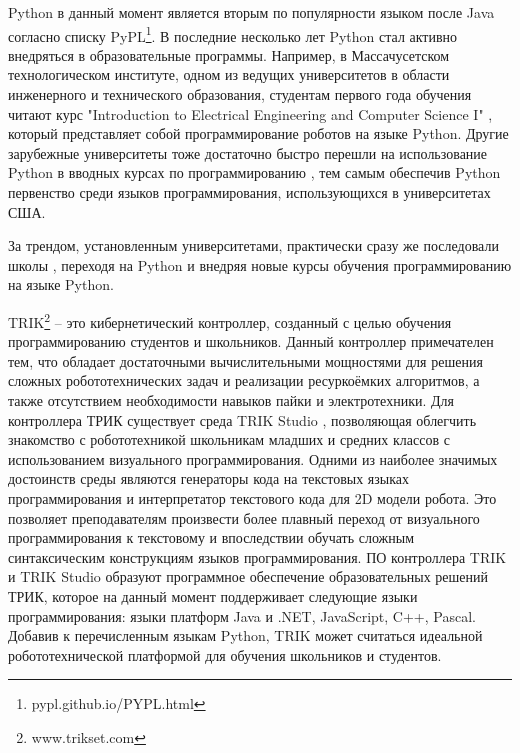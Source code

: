 \documentclass[14pt]{matmex-diploma-custom}
\begin{document}
Python в данный момент является вторым по популярности языком после Java согласно списку PyPL\footnote{pypl.github.io/PYPL.html}. В последние несколько лет Python стал активно внедряться в образовательные программы. Например, в Массачусетском технологическом институте, одном из ведущих университетов в области инженерного и технического образования, студентам первого года обучения читают курс "Introduction to Electrical Engineering and Computer Science I" \cite{stemMITCourse}, который представляет собой программирование роботов на языке Python. Другие зарубежные университеты тоже достаточно быстро перешли на использование Python в вводных курсах по программированию \cite{pythonUni}, тем самым обеспечив Python первенство среди языков программирования, использующихся в университетах США.

За трендом, установленным университетами, практически сразу же последовали школы \cite{stemSecCourse, stemSchool}, переходя на Python и внедряя новые курсы обучения программированию на языке Python.

TRIK\footnote{www.trikset.com} -- это кибернетический контроллер, созданный с целью обучения программированию студентов и школьников. Данный контроллер примечателен тем, что обладает достаточными вычислительными мощностями для решения сложных робототехнических задач и реализации ресуркоёмких алгоритмов, а также отсутствием необходимости навыков пайки и электротехники. Для контроллера ТРИК существует среда TRIK Studio \cite{qrealRobots, TRIKStudioTech}, позволяющая облегчить знакомство с робототехникой школьникам младших и средних классов с использованием визуального программирования. Одними из наиболее значимых достоинств среды являются генераторы кода на текстовых языках программирования и интерпретатор текстового кода для 2D модели робота. Это позволяет преподавателям произвести более плавный переход от визуального программирования к текстовому и впоследствии обучать сложным синтаксическим конструкциям языков программирования. ПО контроллера TRIK и TRIK Studio образуют программное обеспечение образовательных решений ТРИК, которое на данный момент поддерживает следующие языки программирования: языки платформ Java и .NET, JavaScript, C++, Pascal. Добавив к перечисленным языкам Python, TRIK может считаться идеальной робототехнической платформой для обучения школьников и студентов.
\end{document}

